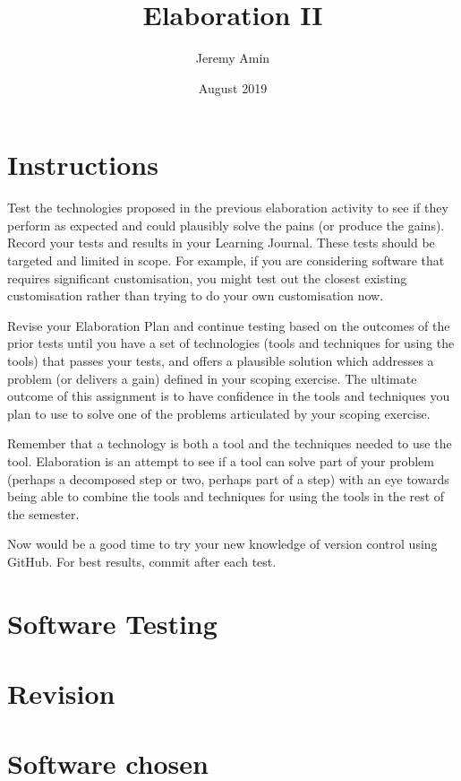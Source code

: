 \documentclass{article}
\title{Elaboration II}
\author{Jeremy Amin}
\date{August 2019}
\begin{document}
\maketitle

\tableofcontents

\section{Instructions}

Test the technologies proposed in the previous elaboration activity to see if they perform as expected and could plausibly solve the pains (or produce the gains). Record your tests and results in your Learning Journal. These tests should be targeted and limited in scope. For example, if you are considering software that requires significant customisation, you might test out the closest existing customisation rather than trying to do your own customisation now.

Revise your Elaboration Plan and continue testing based on the outcomes of the prior tests until you have a set of technologies (tools and techniques for using the tools) that passes your tests, and offers a plausible solution which addresses a problem (or delivers a gain) defined in your scoping exercise. The ultimate outcome of this assignment is to have confidence in the tools and techniques you plan to use to solve one of the problems articulated by your scoping exercise. 

Remember that a technology is both a tool and the techniques needed to use the tool. Elaboration is an attempt to see if a tool can solve part of your problem (perhaps a decomposed step or two, perhaps part of a step) with an eye towards being able to combine the tools and techniques for using the tools in the rest of the semester. 

Now would be a good time to try your new knowledge of version control using GitHub. For best results, commit after each test.

\section{Software Testing}

\section{Revision}

\section{Software chosen}
\end{document}
